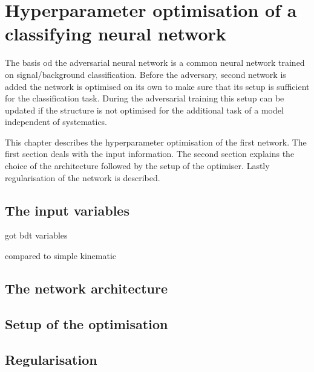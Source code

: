 \chapter{Hyperparameter optimisation of a classifying neural network}
\label{sec:simpleNN}

The basis od the adversarial neural network is a common neural network trained on signal/background classification.
Before the adversary, second network is added the network is optimised on its own to make sure that its setup is sufficient for the classification task.
During the adversarial training this setup can be updated if the structure is not optimised for the additional task of a model independent of systematics.

This chapter describes the hyperparameter optimisation of the first network. The first section deals with the input information.
The second section explains the choice of the architecture followed by the setup of the optimiser.
Lastly regularisation of the network is described.

\section{The input variables}

got bdt variables

compared to simple kinematic



\section{The network architecture}

\section{Setup of the optimisation}

\section{Regularisation}